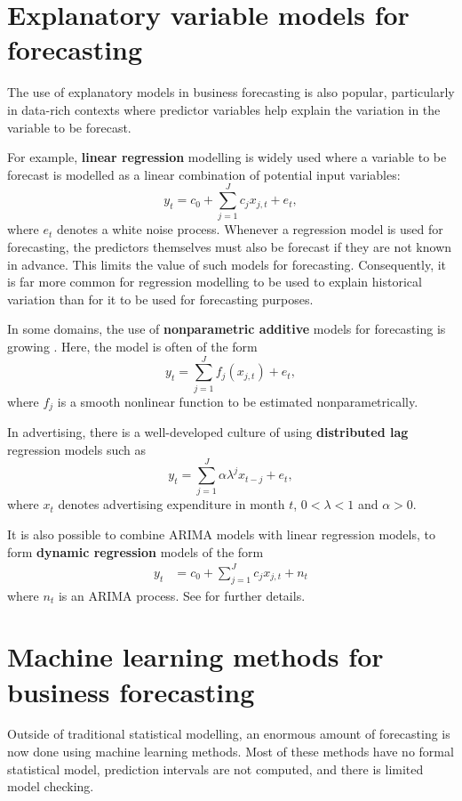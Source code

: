 \documentclass[a4paper,10pt]{article}
\begin{document}
\section{Explanatory variable models for forecasting}

The use of explanatory models in business forecasting is also popular, particularly in data-rich contexts where predictor variables help explain the variation in the variable to be forecast.

For example, \textbf{linear regression} modelling is widely used \citep[e.g.,][]{Pardoe06} where a variable to be forecast is modelled as a linear combination of potential input variables:
\[
	y_t = c_0 + \sum_{j=1}^J c_j x_{j,t} + e_t,
\]
where $e_t$ denotes a white noise process. Whenever a regression model is used for forecasting, the predictors themselves must also be forecast if they are not known in advance. This limits the value of such models for forecasting. Consequently, it is far more common for regression modelling to be used to explain historical variation than for it to be used for forecasting purposes.

In some domains, the use of \textbf{nonparametric additive} models for forecasting is growing \citep[e.g.,][]{HF10}. Here, the model is often of the form
\[
	y_t = \sum_{j=1}^J f_j(x_{j,t}) + e_t,
\]
where $f_j$ is a smooth nonlinear function to be estimated nonparametrically.

In advertising, there is a well-developed culture of using \textbf{distributed lag} regression models \citep[e.g.,][]{HPS01} such as
\[
	y_t = \sum_{j=1}^J \alpha\lambda^j x_{t-j} + e_t,
\]
where $x_t$ denotes advertising expenditure in month $t$, $0<\lambda<1$ and $\alpha>0$.

It is also possible to combine ARIMA models with linear regression models, to form \textbf{dynamic regression} models of the form
\begin{align*}
	y_t & = c_0 + \sum_{j=1}^J c_j x_{j,t} + n_t
\end{align*}
where $n_t$ is an ARIMA process. See \citet{fpp3} for further details.

\section{Machine learning methods for business forecasting}

Outside of traditional statistical modelling, an enormous amount of forecasting is now done using machine learning methods. Most of these methods have no formal statistical model, prediction intervals are not computed, and there is limited model checking.
\end{document}
